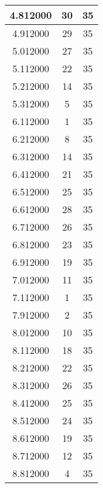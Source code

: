 \begin{longtable}[htbp]{|c|c|c|}
4.812000 & 30 & 35 \\ \hline
4.912000 & 29 & 35 \\ \hline
5.012000 & 27 & 35 \\ \hline
5.112000 & 22 & 35 \\ \hline
5.212000 & 14 & 35 \\ \hline
5.312000 & 5 & 35 \\ \hline
6.112000 & 1 & 35 \\ \hline
6.212000 & 8 & 35 \\ \hline
6.312000 & 14 & 35 \\ \hline
6.412000 & 21 & 35 \\ \hline
6.512000 & 25 & 35 \\ \hline
6.612000 & 28 & 35 \\ \hline
6.712000 & 26 & 35 \\ \hline
6.812000 & 23 & 35 \\ \hline
6.912000 & 19 & 35 \\ \hline
7.012000 & 11 & 35 \\ \hline
7.112000 & 1 & 35 \\ \hline
7.912000 & 2 & 35 \\ \hline
8.012000 & 10 & 35 \\ \hline
8.112000 & 18 & 35 \\ \hline
8.212000 & 22 & 35 \\ \hline
8.312000 & 26 & 35 \\ \hline
8.412000 & 25 & 35 \\ \hline
8.512000 & 24 & 35 \\ \hline
8.612000 & 19 & 35 \\ \hline
8.712000 & 12 & 35 \\ \hline
8.812000 & 4 & 35 \\ \hline
\end{longtable}
